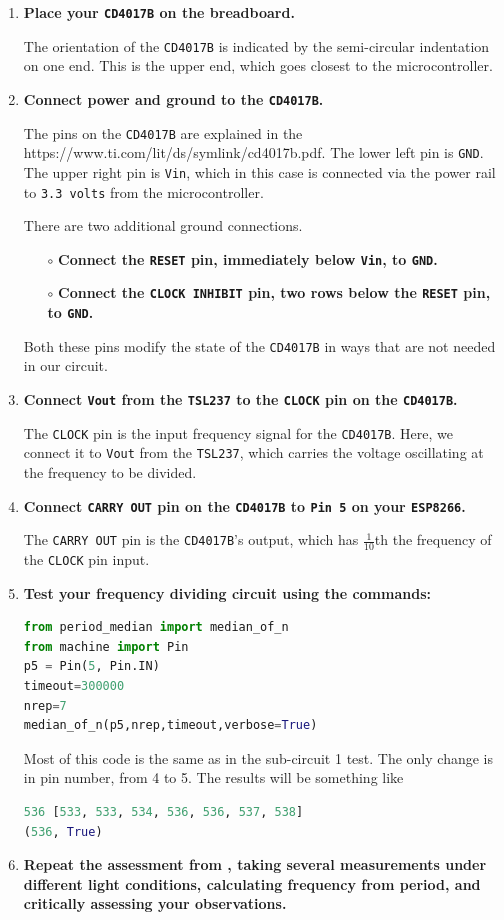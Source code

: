 \begin{enumerate}
	\item \textbf{Place your \texttt{CD4017B} on the breadboard.}
	
	The orientation of the \texttt{CD4017B} is indicated by the semi-circular indentation on one end.
	This is the upper end, which goes closest to the microcontroller.
	
	\item \textbf{Connect power and ground to the \texttt{CD4017B}.}
	
	The pins on the \texttt{CD4017B} are explained in the  {https://www.ti.com/lit/ds/symlink/cd4017b.pdf}.
	The lower left pin is \texttt{GND}.
	The upper right pin is \texttt{Vin}, which in this case is connected via the power rail to \texttt{3.3 volts} from the microcontroller.
	
	\smallskip
	There are two additional ground connections. 
	\begin{itemize}
		\item[$\circ$] \textbf{Connect the \texttt{RESET} pin, immediately below \texttt{Vin}, to \texttt{GND}.} 
		\item[$\circ$] \textbf{Connect the \texttt{CLOCK INHIBIT} pin, two rows below the \texttt{RESET} pin, to \texttt{GND}.}	
	\end{itemize} 
	Both these pins modify the state of the \texttt{CD4017B} in ways that are not needed in our circuit.

	\item \textbf{Connect \texttt{Vout} from the \texttt{TSL237} to the \texttt{CLOCK} pin on the \texttt{CD4017B}.}

	The \texttt{CLOCK} pin is the input frequency signal for the \texttt{CD4017B}.
	Here, we connect it to \texttt{Vout} from the \texttt{TSL237}, which carries the voltage oscillating at the frequency to be divided. 
	
	\item \textbf{Connect \texttt{CARRY OUT} pin on the \texttt{CD4017B} to \texttt{Pin 5} on your \texttt{ESP8266}.}
	
	The \texttt{CARRY OUT} pin is the \texttt{CD4017B}'s output, which has $\frac{1}{10}$th the frequency of the \texttt{CLOCK} pin input. 

	\item \textbf{Test your frequency dividing circuit using the commands:}
\begin{lstlisting}[language=Python]
from period_median import median_of_n
from machine import Pin
p5 = Pin(5, Pin.IN)
timeout=300000
nrep=7
median_of_n(p5,nrep,timeout,verbose=True)
\end{lstlisting}	
	Most of this code is the same as in the sub-circuit 1 test.
	The only change is in pin number, from 4 to 5.
	The results will be something like
\begin{lstlisting}[language=Python]
536 [533, 533, 534, 536, 536, 537, 538]
(536, True)
\end{lstlisting}		
	\item \textbf{Repeat the assessment from , taking several measurements under different light conditions, calculating frequency from period, and critically assessing your observations.}


\end{enumerate}
